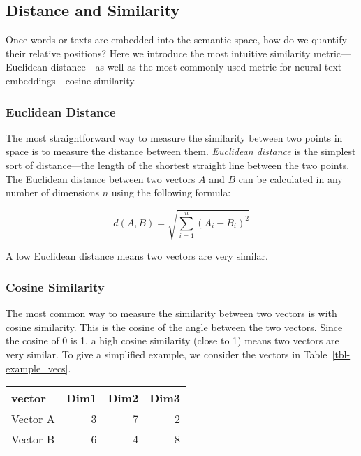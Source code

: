 \documentclass[
  man,
  floatsintext,
  longtable,
  nolmodern,
  notxfonts,
  notimes,
  colorlinks=true,linkcolor=blue,citecolor=blue,urlcolor=blue]{apa7}
\begin{document}
\subsection{Distance and Similarity}\label{distance-and-similarity}

Once words or texts are embedded into the semantic space, how do we
quantify their relative positions? Here we introduce the most intuitive
similarity metric---Euclidean distance---as well as the most commonly
used metric for neural text embeddings---cosine similarity.

\subsubsection{Euclidean Distance}\label{euclidean-distance}

The most straightforward way to measure the similarity between two
points in space is to measure the distance between them. \emph{Euclidean
distance} is the simplest sort of distance---the length of the shortest
straight line between the two points. The Euclidean distance between two
vectors \(A\) and \(B\) can be calculated in any number of dimensions
\(n\) using the following formula:

\[
d\left( A,B\right)   = \sqrt {\sum _{i=1}^{n}  \left( A_{i}-B_{i}\right)^2 }
\]

A low Euclidean distance means two vectors are very similar.

\subsubsection{Cosine Similarity}\label{cosine-similarity}

The most common way to measure the similarity between two vectors is
with cosine similarity. This is the cosine of the angle between the two
vectors. Since the cosine of 0 is 1, a high cosine similarity (close to
1) means two vectors are very similar. To give a simplified example, we
consider the vectors in Table~\ref{tbl-example_vecs}.

\begin{table}

{\caption{{Example Three-Dimensional Vectors}{\label{tbl-example_vecs}}}
\vspace{-20pt}}

\begin{longtable}[]{@{}lrrr@{}}
\toprule\noalign{}
vector & Dim1 & Dim2 & Dim3 \\
\midrule\noalign{}
\endhead
\bottomrule\noalign{}
\endlastfoot
Vector A & 3 & 7 & 2 \\
Vector B & 6 & 4 & 8 \\
\end{longtable}

\end{table}
\end{document}
